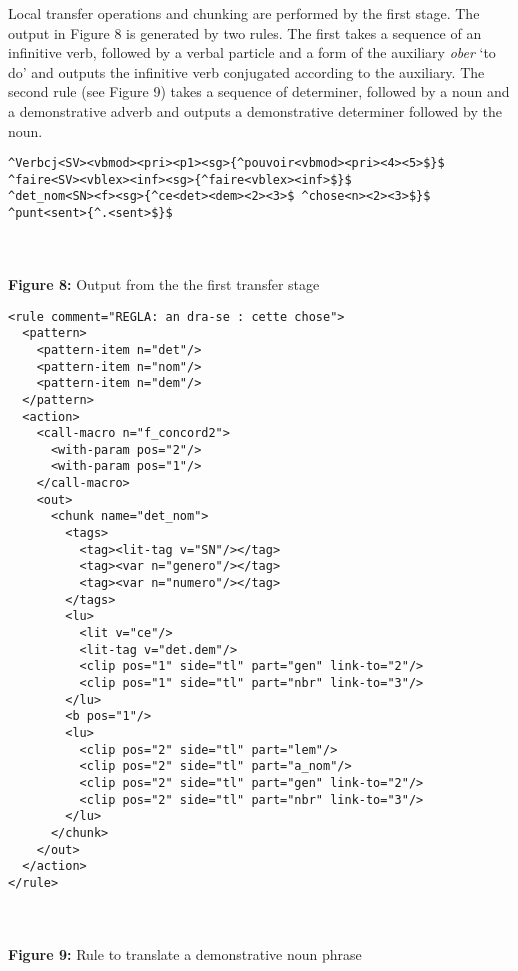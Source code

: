 \documentclass[a0,landscape]{a0poster}
\begin{document}
\begin{multicols}{4}
\noindent
Local transfer operations and chunking are performed by the first stage. The output in Figure 8 is generated by two rules.  The first takes a sequence of an infinitive verb, followed by a verbal particle and a form of 
the auxiliary \emph{ober} `to do' and outputs the infinitive verb conjugated according 
to the auxiliary. The second rule (see Figure 9) takes a sequence of determiner, followed by a noun and a 
demonstrative adverb and outputs a demonstrative determiner followed by the noun.\\

\begin{center}
\begin{minipage}[b]{26cm}
\begin{small}
\begin{verbatim}
^Verbcj<SV><vbmod><pri><p1><sg>{^pouvoir<vbmod><pri><4><5>$}$ 
^faire<SV><vblex><inf><sg>{^faire<vblex><inf>$}$ 
^det_nom<SN><f><sg>{^ce<det><dem><2><3>$ ^chose<n><2><3>$}$
^punt<sent>{^.<sent>$}$
\end{verbatim}
\end{small}
\end{minipage}\\
~\\
\textbf{Figure 8:} Output from the the first transfer stage
\vspace{0.5cm}
\end{center}
\vspace{0.2cm}

\begin{center}
\begin{minipage}[b]{25cm}
\begin{small}
\begin{verbatim}
<rule comment="REGLA: an dra-se : cette chose">
  <pattern>
    <pattern-item n="det"/>
    <pattern-item n="nom"/>
    <pattern-item n="dem"/>
  </pattern>
  <action>
    <call-macro n="f_concord2">
      <with-param pos="2"/>
      <with-param pos="1"/>
    </call-macro>
    <out>
      <chunk name="det_nom">
        <tags>
          <tag><lit-tag v="SN"/></tag>
          <tag><var n="genero"/></tag>
          <tag><var n="numero"/></tag>
        </tags>
        <lu>
          <lit v="ce"/>
          <lit-tag v="det.dem"/>
          <clip pos="1" side="tl" part="gen" link-to="2"/>
          <clip pos="1" side="tl" part="nbr" link-to="3"/>
        </lu>
        <b pos="1"/>
        <lu>
          <clip pos="2" side="tl" part="lem"/>
          <clip pos="2" side="tl" part="a_nom"/>
          <clip pos="2" side="tl" part="gen" link-to="2"/>
          <clip pos="2" side="tl" part="nbr" link-to="3"/>
        </lu>
      </chunk>
    </out>
  </action>
</rule>
\end{verbatim}
\end{small}
\end{minipage}\\
~\\
\textbf{Figure 9:} Rule to translate a demonstrative noun phrase
\vspace{0.5cm}
\end{center}
\vspace{0.2cm}


\end{multicols}
\end{document}
